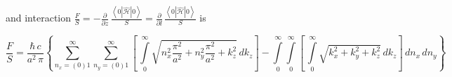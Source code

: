 \documentclass[twoside, 10pt]{article}
\begin{document}
and interaction
\(\frac{F}{S} = -\frac{\partial }{\partial z} \,\frac{\left<0|\hat{\mathcal{H}}|0\right>}{S} = \frac{\partial}{\partial l} \,\frac{\left<0|\hat{\mathcal{H}}|0\right>}{S}\)
is


\noindent
\begin{equation}\frac{F}{S} = \frac{\hbar\,c}{a^2\,\pi}\left\{\sum\limits_{n_x=(0)1}^{\infty}\sum\limits_{n_y=(0)1}^{\infty}\left[\,\int\limits_{0}^{\infty}\sqrt{n_x^2\frac{\pi^2}{a^2}+n_y^2\frac{\pi^2}{a^2}+k_z^2}\,dk_z\right] -
\int\limits_{0}^{\infty}\int\limits_{0}^{\infty}\left[\,\int\limits_{0}^{\infty}\sqrt{k_x^2+k_y^2+k_z^2}\,dk_z\right]\,dn_x\,dn_y\right\}\end{equation}
\end{document}
